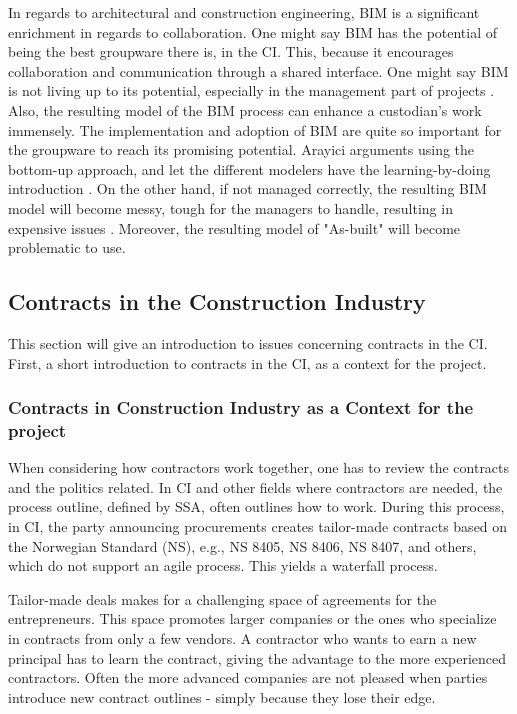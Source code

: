 In regards to architectural and construction engineering, BIM is a significant enrichment in regards to collaboration. One might say BIM has the potential of being the best groupware there is, in the CI. This, because it encourages collaboration and communication through a shared interface. One might say BIM is not living up to its potential, especially in the management part of projects \cite{eadie2013bim}. Also, the resulting model of the BIM process can enhance a custodian's work immensely. The implementation and adoption of BIM are quite so important for the groupware to reach its promising potential. Arayici arguments using the bottom-up approach, and let the different modelers have the learning-by-doing introduction \cite{arayici2011technology}. On the other hand, if not managed correctly, the resulting BIM model will become messy, tough for the managers to handle, resulting in expensive issues \cite{suermann2009evaluating}. Moreover, the resulting model of "As-built" will become problematic to use. 

\subsection{Contracts in the Construction Industry}
This section will give an introduction to issues concerning contracts in the CI. First, a short introduction to contracts in the CI, as a context for the project. 

\subsubsection*{Contracts in Construction Industry as a Context for the project}
When considering how contractors work together, one has to review the contracts and the politics related. In CI and other fields where contractors are needed, the process outline, defined by SSA, often outlines how to work. During this process, in CI, the party announcing procurements creates tailor-made contracts based on the Norwegian Standard (NS), e.g., NS 8405, NS 8406, NS 8407, and others, which do not support an agile process. This yields a waterfall process. 

Tailor-made deals makes for a challenging space of agreements for the entrepreneurs. This space promotes larger companies or the ones who specialize in contracts from only a few vendors. A contractor who wants to earn a new principal has to learn the contract, giving the advantage to the more experienced contractors. Often the more advanced companies are not pleased when parties introduce new contract outlines - simply because they lose their edge. 

